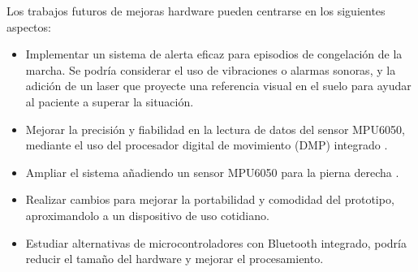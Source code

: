  Los trabajos futuros de mejoras hardware pueden centrarse en los siguientes aspectos: 
\begin{itemize}
    \item Implementar un sistema de alerta eficaz para episodios de congelación de la marcha. Se podría considerar el uso de vibraciones o alarmas sonoras, y la adición de un laser que proyecte una referencia visual en el suelo para ayudar al paciente a superar la situación.
    \item Mejorar la precisión y fiabilidad en la lectura de datos del sensor MPU6050, mediante el uso del procesador digital de movimiento (DMP) integrado \cite{saragonz91:online}.
    \item Ampliar el sistema añadiendo un sensor MPU6050 para la pierna derecha \cite{saragonz91:online}.
    \item Realizar cambios para mejorar la portabilidad y comodidad del prototipo, aproximandolo a un dispositivo de uso cotidiano.
    \item Estudiar alternativas de microcontroladores con Bluetooth integrado, podría reducir el tamaño del hardware y mejorar el procesamiento.
\end{itemize}
